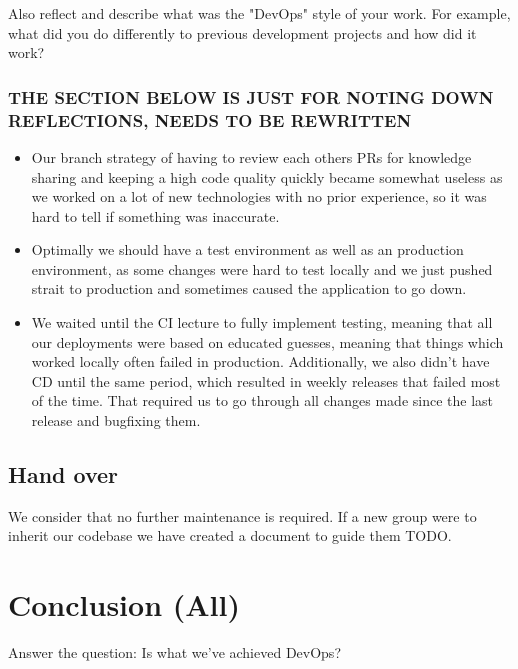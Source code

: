 \documentclass{article}
\begin{document}
Also reflect and describe what was the "DevOps" style of your work. For example, what did you do differently to previous development projects and how did it work?


\subsubsection{THE SECTION BELOW IS JUST FOR NOTING DOWN REFLECTIONS, NEEDS TO BE REWRITTEN}
\begin{itemize}
    \item Our branch strategy of having to review each others PRs for knowledge sharing and keeping a high code quality quickly became somewhat useless as we worked on a lot of new technologies with no prior experience, so it was hard to tell if something was inaccurate. 
    \item Optimally we should have a test environment as well as an production environment, as some changes were hard to test locally and we just pushed strait to production and sometimes caused the application to go down.
    \item We waited until the CI lecture to fully implement testing, meaning that all our deployments were based on educated guesses, meaning that things which worked locally often failed in production. Additionally, we also didn't have CD until the same period, which resulted in weekly releases that failed most of the time. That required us to go through all changes made since the last release and bugfixing them.
\end{itemize}
 

\subsection{Hand over}

We consider that no further maintenance is required. If a new group were to inherit our codebase we have created a document to guide them TODO. 

\section{Conclusion (All)}

Answer the question: Is what we've achieved DevOps?



\end{document}
